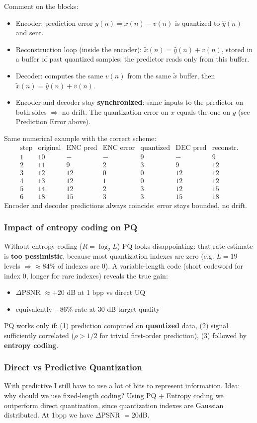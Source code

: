 Comment on the blocks:
\begin{itemize}
    \item Encoder: prediction error $y(n) = x(n) - v(n)$ is quantized to $\hat{y}(n)$ and sent.
    \item Reconstruction loop (inside the encoder): $\tilde{x}(n) = \hat{y}(n) + v(n)$, stored in a buffer of past quantized samples; the predictor reads only from this buffer.
    \item Decoder: computes the same $v(n)$ from the same $\tilde{x}$ buffer, then $\tilde{x}(n) = \hat{y}(n) + v(n)$.
    \item Encoder and decoder stay \textbf{synchronized}: same inputs to the predictor on both sides $\Rightarrow$ no drift. The quantization error on $x$ equals the one on $y$ (see Prediction Error above).
\end{itemize}
Same numerical example with the correct scheme:
$$\begin{array}{c|cccccc}
\text{step} & \text{original} & \text{ENC pred} & \text{ENC error} & \text{quantized} & \text{DEC pred} & \text{reconstr.}\\\hline
1 & 10 & - & - & 9 & - & 9\\
2 & 11 & 9 & 2 & 3 & 9 & 12\\
3 & 12 & 12 & 0 & 0 & 12 & 12\\
4 & 13 & 12 & 1 & 0 & 12 & 12\\
5 & 14 & 12 & 2 & 3 & 12 & 15\\
6 & 18 & 15 & 3 & 3 & 15 & 18
\end{array}$$
Encoder and decoder predictions always coincide: error stays bounded, no drift.
\subsubsection{Impact of entropy coding on PQ}
Without entropy coding ($R = \log_2 L$) PQ looks disappointing: that rate estimate is \textbf{too pessimistic}, because most quantization indexes are zero (e.g. $L = 19$ levels $\Rightarrow \approx 84\%$ of indexes are 0). A variable-length code (short codeword for index 0, longer for rare indexes) reveals the true gain:
\begin{itemize}
    \item $\Delta$PSNR $\approx +20$ dB at 1 bpp vs direct UQ
    \item equivalently $-86\%$ rate at 30 dB target quality
\end{itemize}
PQ works only if: (1) prediction computed on \textbf{quantized} data, (2) signal sufficiently correlated ($\rho > 1/2$ for trivial first-order prediction), (3) followed by \textbf{entropy coding}.
\subsubsection{Direct vs Predictive Quantization}
With predictive I still have to use a lot of bits to represent information. 
Idea: why should we use fixed-length coding? 
Using PQ + Entropy coding we outperform direct quantization, since quantization indexes are Gaussian distributed. 
At 1bpp we have $\Delta $PSNR $ = 20$dB.
